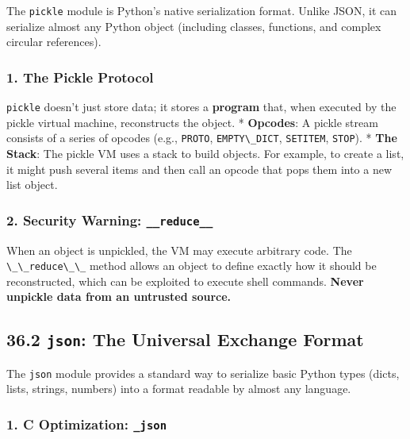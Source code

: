 The \passthrough{\lstinline!pickle!} module is Python's native
serialization format. Unlike JSON, it can serialize almost any Python
object (including classes, functions, and complex circular references).

\hypertarget{the-pickle-protocol}{%
\subsubsection{1. The Pickle Protocol}\label{the-pickle-protocol}}

\passthrough{\lstinline!pickle!} doesn't just store data; it stores a
\textbf{program} that, when executed by the pickle virtual machine,
reconstructs the object. * \textbf{Opcodes}: A pickle stream consists of
a series of opcodes (e.g., \passthrough{\lstinline!PROTO!},
\passthrough{\lstinline!EMPTY\_DICT!},
\passthrough{\lstinline!SETITEM!}, \passthrough{\lstinline!STOP!}). *
\textbf{The Stack}: The pickle VM uses a stack to build objects. For
example, to create a list, it might push several items and then call an
opcode that pops them into a new list object.

\hypertarget{security-warning-__reduce__}{%
\subsubsection{\texorpdfstring{2. Security Warning:
\texttt{\_\_reduce\_\_}}{2. Security Warning: \_\_reduce\_\_}}\label{security-warning-__reduce__}}

When an object is unpickled, the VM may execute arbitrary code. The
\passthrough{\lstinline!\_\_reduce\_\_!} method allows an object to
define exactly how it should be reconstructed, which can be exploited to
execute shell commands. \textbf{Never unpickle data from an untrusted
source.}

\hypertarget{json-the-universal-exchange-format}{%
\subsection{\texorpdfstring{36.2 \texttt{json}: The Universal Exchange
Format}{36.2 json: The Universal Exchange Format}}\label{json-the-universal-exchange-format}}

The \passthrough{\lstinline!json!} module provides a standard way to
serialize basic Python types (dicts, lists, strings, numbers) into a
format readable by almost any language.

\hypertarget{c-optimization-_json}{%
\subsubsection{\texorpdfstring{1. C Optimization:
\texttt{\_json}}{1. C Optimization: \_json}}\label{c-optimization-_json}}

